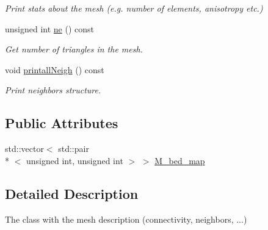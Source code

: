 \begin{DoxyCompactItemize}
\begin{DoxyCompactList}\small\item\em Print stats about the mesh (e.\-g. number of elements, anisotropy etc.) \end{DoxyCompactList}\item 
unsigned int \hyperlink{classTspeed_1_1Mesh_ac5b8a388b633ac0d280f89f56f2b15c5}{ne} () const 
\begin{DoxyCompactList}\small\item\em Get number of triangles in the mesh. \end{DoxyCompactList}\item 
void \hyperlink{classTspeed_1_1Mesh_a7ea0757951214e8dc3a68e9a60a1c17c}{printall\-Neigh} () const 
\begin{DoxyCompactList}\small\item\em Print neighbors structure. \end{DoxyCompactList}\end{DoxyCompactItemize}
\subsection*{Public Attributes}
\begin{DoxyCompactItemize}
\item 
std\-::vector$<$ std\-::pair\\*
$<$ unsigned int, unsigned int $>$ $>$ \hyperlink{classTspeed_1_1Mesh_a8cb823f02d7c75e48bf714b367b25b7d}{M\-\_\-bed\-\_\-map}
\end{DoxyCompactItemize}


\subsection{Detailed Description}
The class with the mesh description (connectivity, neighbors, ...) 

